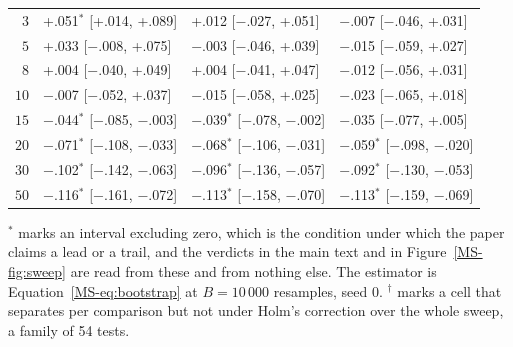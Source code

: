 \begin{table}[h]
\begin{threeparttable}
\begin{tabular}{rlll}
$3$ & +.051$^{*}$\phantom{$^{\dagger}$} [+.014, +.089] & +.012\phantom{$^{*}$}\phantom{$^{\dagger}$} [$-$.027, +.051] & $-$.007\phantom{$^{*}$}\phantom{$^{\dagger}$} [$-$.046, +.031] \\
$5$ & +.033\phantom{$^{*}$}\phantom{$^{\dagger}$} [$-$.008, +.075] & $-$.003\phantom{$^{*}$}\phantom{$^{\dagger}$} [$-$.046, +.039] & $-$.015\phantom{$^{*}$}\phantom{$^{\dagger}$} [$-$.059, +.027] \\
$8$ & +.004\phantom{$^{*}$}\phantom{$^{\dagger}$} [$-$.040, +.049] & +.004\phantom{$^{*}$}\phantom{$^{\dagger}$} [$-$.041, +.047] & $-$.012\phantom{$^{*}$}\phantom{$^{\dagger}$} [$-$.056, +.031] \\
$10$ & $-$.007\phantom{$^{*}$}\phantom{$^{\dagger}$} [$-$.052, +.037] & $-$.015\phantom{$^{*}$}\phantom{$^{\dagger}$} [$-$.058, +.025] & $-$.023\phantom{$^{*}$}\phantom{$^{\dagger}$} [$-$.065, +.018] \\
$15$ & $-$.044$^{*}$\phantom{$^{\dagger}$} [$-$.085, $-$.003] & $-$.039$^{*}$\phantom{$^{\dagger}$} [$-$.078, $-$.002] & $-$.035\phantom{$^{*}$}\phantom{$^{\dagger}$} [$-$.077, +.005] \\
$20$ & $-$.071$^{*}$\phantom{$^{\dagger}$} [$-$.108, $-$.033] & $-$.068$^{*}$\phantom{$^{\dagger}$} [$-$.106, $-$.031] & $-$.059$^{*}$\phantom{$^{\dagger}$} [$-$.098, $-$.020] \\
$30$ & $-$.102$^{*}$\phantom{$^{\dagger}$} [$-$.142, $-$.063] & $-$.096$^{*}$\phantom{$^{\dagger}$} [$-$.136, $-$.057] & $-$.092$^{*}$\phantom{$^{\dagger}$} [$-$.130, $-$.053] \\
$50$ & $-$.116$^{*}$\phantom{$^{\dagger}$} [$-$.161, $-$.072] & $-$.113$^{*}$\phantom{$^{\dagger}$} [$-$.158, $-$.070] & $-$.113$^{*}$\phantom{$^{\dagger}$} [$-$.159, $-$.069] \\
\bottomrule
\end{tabular}
\begin{tablenotes}[flushleft]\footnotesize
\item $^{*}$ marks an interval excluding zero, which is the condition under which the paper claims a lead or a trail, and the verdicts in the main text and in Figure~\ref{MS-fig:sweep} are read from these and from nothing else. The estimator is Equation~\ref{MS-eq:bootstrap} at $B = 10\,000$ resamples, seed 0. $^{\dagger}$ marks a cell that separates per comparison but not under Holm's correction over the whole sweep, a family of 54 tests.
\end{tablenotes}
\end{threeparttable}
\end{table}
